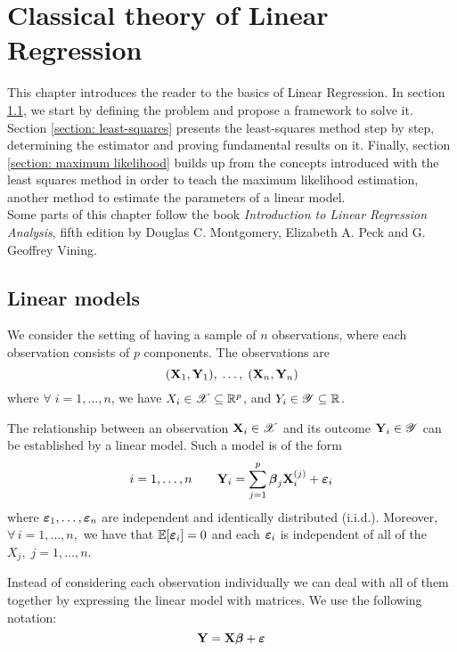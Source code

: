\chapter{Classical theory of Linear Regression}
\label{chapter: classical theory of linear regression}

This chapter introduces the reader to the basics of Linear Regression. In section \ref{section: linear models}, we start by defining the problem and propose a framework to solve it. Section \ref{section: least-squares} presents the least-squares method step by step, determining the estimator and proving fundamental results on it. Finally, section \ref{section: maximum likelihood} builds up from the concepts introduced with the least squares method in order to teach the maximum likelihood estimation, another method to estimate the parameters of a linear model. \\
Some parts of this chapter follow the book \textit{Introduction to Linear Regression Analysis}, fifth edition by Douglas C. Montgomery, Elizabeth A. Peck and G. Geoffrey Vining.

\section{Linear models}
\label{section: linear models}

We consider the setting of having a sample of $n$ observations, where each observation consists of \(p\) components. The observations are
\[
    (\mathbf{X}_1, \mathbf{Y}_1), \; \ldots , \;(\mathbf{X}_n, \mathbf{Y}_n)
\]
where \(\forall \; i = 1, \ldots, n\), we have \(X_i \in \mathscr{X} \subseteq \mathbb{R}^p\), and \(Y_i \in \mathscr{Y} \subseteq \mathbb{R}\).

\begin{definition}
    The relationship between an observation $\mathbf{X}_i \in \mathscr{X}$ and its outcome $\mathbf{Y}_i \in \mathscr{Y}$ can be established by a linear model. Such a model is of the form
    \begin{equation}
        i = 1, \ldots, n \qquad \mathbf{Y}_{i} = \sum_{j=1}^{p} \boldsymbol{\beta}_{j} \mathbf{X}_{i}^{(j)} + \boldsymbol{\varepsilon}_{i}
    \end{equation}
    where \(\boldsymbol{\varepsilon}_1, \ldots, \boldsymbol{\varepsilon}_n\) are independent and identically distributed (i.i.d.). Moreover, \(\forall \, i = 1, \ldots, n, \) we have that \( \mathbb{E} [\boldsymbol{\varepsilon}_i] = 0\) and each \(\boldsymbol{\varepsilon}_i\) is independent of all of the \( X_j, \; j=1, \ldots, n \).
\end{definition}
Instead of considering each observation individually we can deal with all of them together by expressing the linear model with matrices. We use the following notation:
\begin{equation}
    \label{eqn: linear model (matrix)}
    \mathbf{Y} = \mathbf{X} \boldsymbol{\beta} + \boldsymbol{\varepsilon}
\end{equation}

